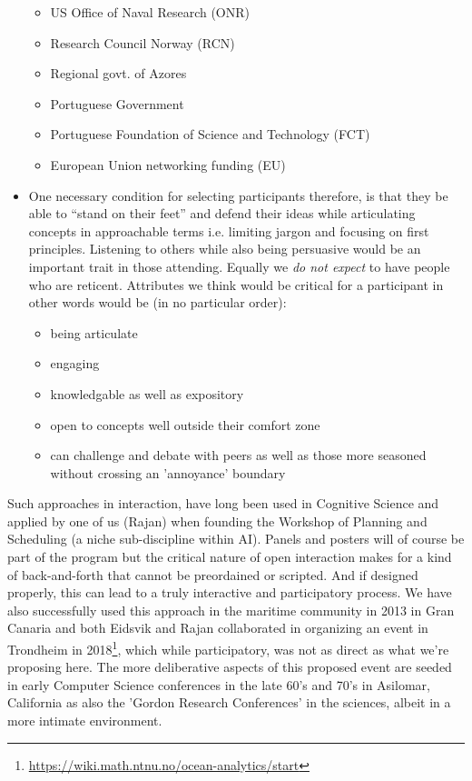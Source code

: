 \documentclass[10pt,letterpaper]{article}
\begin{document}
\begin{itemize}
\begin{itemize}
  \item US Office of Naval Research (ONR)
  \item Research Council Norway (RCN)
  \item Regional govt. of Azores
  \item Portuguese Government
  \item Portuguese Foundation of Science and Technology (FCT)
  \item European Union networking funding (EU)

  \end{itemize}

\item One necessary condition for selecting participants therefore, is
  that they be able to ``stand on their feet'' and defend their ideas
  while articulating concepts in approachable terms i.e. limiting
  jargon and focusing on first principles. Listening to others while
  also being persuasive would be an important trait in those
  attending. Equally we \emph{do not expect} to have people who are
  reticent. Attributes we think would be critical for a participant in
  other words would be (in no particular order):

  \begin{itemize}

  \item being articulate
  \item engaging
  \item knowledgable as well as expository
  \item open to concepts well outside their comfort zone
  \item can challenge and debate with peers as well as those more
    seasoned without crossing an 'annoyance' boundary

  \end{itemize}

\end{itemize}  

\noindent
Such approaches in interaction, have long been used in Cognitive
Science and applied by one of us (Rajan) when founding the \nas
Workshop of Planning and Scheduling (a niche sub-discipline within
AI). Panels and posters will of course be part of the program but the
critical nature of open interaction makes for a kind of back-and-forth
that cannot be preordained or scripted. And if designed properly, this
can lead to a truly interactive and participatory process. We have
also successfully used this approach in the maritime community in 2013
in Gran Canaria and both Eidsvik and Rajan collaborated in organizing
an event in Trondheim in
2018\footnote{\url{https://wiki.math.ntnu.no/ocean-analytics/start}},
which while participatory, was not as direct as what we're proposing
here. The more deliberative aspects of this proposed event are seeded
in early Computer Science conferences in the late 60's and 70's in
Asilomar, California as also the 'Gordon Research Conferences' in the
sciences, albeit in a more intimate environment.
\end{document}
